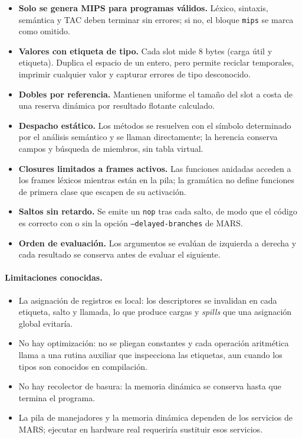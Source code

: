 \documentclass[11pt,a4paper]{article}
\begin{document}
\begin{itemize}[leftmargin=1.4em]
  \item \textbf{Solo se genera MIPS para programas válidos.} Léxico, sintaxis,
        semántica y TAC deben terminar sin errores; si no, el bloque
        \texttt{mips} se marca como omitido.
  \item \textbf{Valores con etiqueta de tipo.} Cada slot mide 8 bytes (carga útil
        y etiqueta). Duplica el espacio de un entero, pero permite reciclar
        temporales, imprimir cualquier valor y capturar errores de tipo
        desconocido.
  \item \textbf{Dobles por referencia.} Mantienen uniforme el tamaño del slot a
        costa de una reserva dinámica por resultado flotante calculado.
  \item \textbf{Despacho estático.} Los métodos se resuelven con el símbolo
        determinado por el análisis semántico y se llaman directamente; la
        herencia conserva campos y búsqueda de miembros, sin tabla virtual.
  \item \textbf{Closures limitados a frames activos.} Las funciones anidadas
        acceden a los frames léxicos mientras están en la pila; la gramática no
        define funciones de primera clase que escapen de su activación.
  \item \textbf{Saltos sin retardo.} Se emite un \texttt{nop} tras cada salto,
        de modo que el código es correcto con o sin la opción
        \texttt{--delayed-branches} de MARS.
  \item \textbf{Orden de evaluación.} Los argumentos se evalúan de izquierda a
        derecha y cada resultado se conserva antes de evaluar el siguiente.
\end{itemize}

\paragraph{Limitaciones conocidas.}

\begin{itemize}[leftmargin=1.4em]
  \item La asignación de registros es local: los descriptores se invalidan en
        cada etiqueta, salto y llamada, lo que produce cargas y \emph{spills}
        que una asignación global evitaría.
  \item No hay optimización: no se pliegan constantes y cada operación
        aritmética llama a una rutina auxiliar que inspecciona las etiquetas,
        aun cuando los tipos son conocidos en compilación.
  \item No hay recolector de basura: la memoria dinámica se conserva hasta que
        termina el programa.
  \item La pila de manejadores y la memoria dinámica dependen de los servicios de
        MARS; ejecutar en hardware real requeriría sustituir esos servicios.
\end{itemize}
\end{document}
